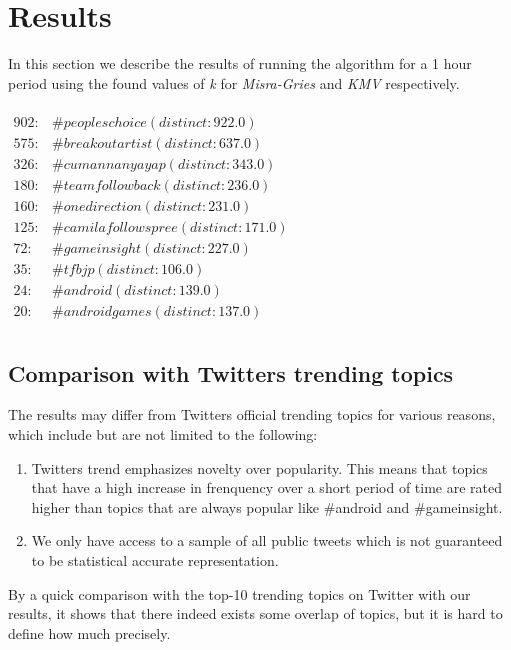 \section{Results}\label{results}
In this section we describe the results of running the algorithm for a 1 hour period using the found values of \textit{k} for \textit{Misra-Gries} and \textit{KMV} respectively.
\\\\
$\begin{array}{ll}
    902: & \#peopleschoice (distinct: 922.0) \\
    575: & \#breakoutartist (distinct: 637.0) \\
    326: & \#cumannanyayap (distinct: 343.0) \\
    180: & \#teamfollowback (distinct: 236.0) \\
    160: & \#onedirection (distinct: 231.0) \\
    125: & \#camilafollowspree (distinct: 171.0) \\
    72: & \#gameinsight (distinct: 227.0) \\
    35: & \#tfbjp (distinct: 106.0) \\
    24: & \#android (distinct: 139.0) \\
    20: & \#androidgames (distinct: 137.0) \\
\end{array}$

\subsection{Comparison with Twitters trending topics}\label{twitter-result}
The results may differ from Twitters official trending topics for various reasons, which include but are not limited to the following: 
\\
\begin{enumerate}
	\item Twitters trend emphasizes novelty over popularity. This means that topics that have a high increase in frenquency over a short period of time are rated higher than topics that are always popular like \#android and \#gameinsight. 
	\item We only have access to a sample of all public tweets which is not guaranteed to be statistical accurate representation.
\end{enumerate}

By a quick comparison with the top-10 trending topics on Twitter with our results, it shows that there indeed exists some overlap of topics, but it is hard to define how much precisely.


